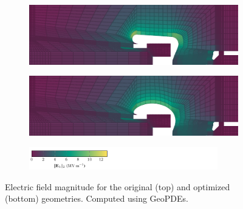 \documentclass[journal, transmag]{IEEEtran}
\begin{document}
    \begin{figure}[t]
        \begin{center}
        \begin{subfigure}{0.45\textwidth}
            \begin{center}
            \includegraphics[width=\textwidth]{field_original}
            \end{center}
        \end{subfigure}

        \medskip

        \begin{subfigure}{0.45\textwidth}
            \begin{center}
            \includegraphics[width=\textwidth]{field_optimized}
            \end{center}
        \end{subfigure}
        \begin{subfigure}{\textwidth}
            \begin{center}
            \includegraphics[width=0.9\textwidth]{colorbar}
            \end{center}
        \end{subfigure}
        \caption{Electric field magnitude for the original (top) and optimized (bottom) geometries. Computed using GeoPDEs.}
        \label{fig:field}
        \end{center}
    \end{figure}
\end{document}
